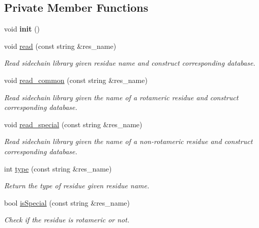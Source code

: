 \subsection*{Private Member Functions}
\begin{DoxyCompactItemize}
\item 
\hypertarget{classRotamer_adefa784f73374d8733c3ad4f16b1d31c}{void {\bfseries init} ()}\label{classRotamer_adefa784f73374d8733c3ad4f16b1d31c}

\item 
void \hyperlink{classRotamer_a2d93b2979227b805045d511b1997d03c}{read} (const string \&res\-\_\-name)
\begin{DoxyCompactList}\small\item\em Read sidechain library given residue name and construct corresponding database. \end{DoxyCompactList}\item 
void \hyperlink{classRotamer_a7336f877be41970bef9323a037ad4b9b}{read\-\_\-common} (const string \&res\-\_\-name)
\begin{DoxyCompactList}\small\item\em Read sidechain library given the name of a rotameric residue and construct corresponding database. \end{DoxyCompactList}\item 
void \hyperlink{classRotamer_acc03226b45abfeac3f9c1ff15907871d}{read\-\_\-special} (const string \&res\-\_\-name)
\begin{DoxyCompactList}\small\item\em Read sidechain library given the name of a non-\/rotameric residue and construct corresponding database. \end{DoxyCompactList}\item 
int \hyperlink{classRotamer_a83414f9d04c442941780a44214358c64}{type} (const string \&res\-\_\-name)
\begin{DoxyCompactList}\small\item\em Return the type of residue given residue name. \end{DoxyCompactList}\item 
bool \hyperlink{classRotamer_a2210953e3efdc034621b1e346bccd353}{is\-Special} (const string \&res\-\_\-name)
\begin{DoxyCompactList}\small\item\em Check if the residue is rotameric or not. \end{DoxyCompactList}\end{DoxyCompactItemize}
